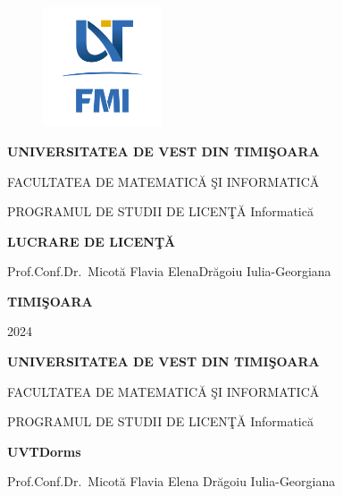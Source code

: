 \documentclass[12pt,a4paper]{report}
\theoremstyle{definition}
\theoremstyle{remark}
\begin{document}
\thispagestyle{empty}
\begin{center}
    \begin{figure}[H]
        \vspace{-20pt}
        \begin{center}
            \includegraphics[width=100pt]{resurse/FMI-03.png}
        \end{center}
    \end{figure}


    {\large{\bf UNIVERSITATEA DE VEST DIN TIMI\c SOARA

        FACULTATEA DE MATEMATIC\u A \c SI INFORMATIC\u A

        PROGRAMUL DE STUDII DE LICEN\c T\u A Informatic\u a  }}

    \vspace{120pt}
    {\huge {\bf LUCRARE DE LICEN\c T\u A}}

    \vspace{150pt}
\end{center}

{\large{}

\noindent Prof.Conf.Dr.\ Micotă Flavia Elena\hfill Dr\u agoiu  Iulia-Georgiana}

\vfill
\begin{center}
    {\bf TIMI\c SOARA

        2024}
\end{center}
\newpage
\thispagestyle{empty}
\begin{center}
    {\large{\bf UNIVERSITATEA DE VEST DIN TIMI\c SOARA

            FACULTATEA DE MATEMATIC\u A \c SI INFORMATIC\u A


            PROGRAMUL DE STUDII DE LICEN\c T\u A  Informatic\u a  }}

    \vspace{120pt}
    {\huge {\bf UVTDorms}}

    \vspace{150pt}
\end{center}

{\large{}

\noindent Prof.Conf.Dr.\ Micot\u a Flavia Elena \hfill Dr\u agoiu Iulia-Georgiana}
\end{document}
